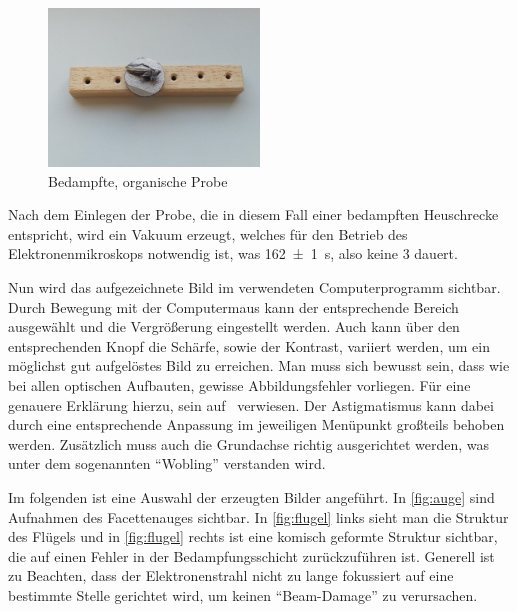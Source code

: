 \documentclass[12pt,english,ngerman]{scrartcl}
\begin{document}
\begin{figure}[H]
	\begin{center}
		\includegraphics[width =0.5\textwidth]{./figures/probe.png}
	\end{center}
	\caption[Bedampfte, organische Probe] {Bedampfte, organische
		Probe~\cite{zankel_bedampfte_nodate}
	}\label{fig:probe}
\end{figure}

Nach dem Einlegen der Probe, die in diesem Fall einer bedampften Heuschrecke entspricht,
wird ein Vakuum erzeugt, welches für den Betrieb
des Elektronenmikroskops notwendig ist, was \SI{162(1)}{\s}, also keine
\SI{3}{\min} dauert.

Nun wird das aufgezeichnete Bild im verwendeten Computerprogramm sichtbar.
Durch Bewegung mit der Computermaus kann der entsprechende Bereich ausgewählt
und die Vergrößerung eingestellt werden. Auch kann über den entsprechenden
Knopf die Schärfe, sowie der Kontrast, variiert werden, um ein möglichst gut
aufgelöstes Bild zu erreichen. Man muss sich bewusst sein, dass wie bei allen
optischen Aufbauten, gewisse Abbildungsfehler vorliegen. Für eine genauere
Erklärung hierzu, sein auf~\cite{zankel_vorbereitungsunterlagen_2013}
verwiesen. Der Astigmatismus kann dabei durch eine entsprechende Anpassung im jeweiligen
Menüpunkt großteils behoben werden. Zusätzlich muss auch die Grundachse richtig
ausgerichtet werden, was unter dem sogenannten ``Wobling'' verstanden wird.

Im folgenden ist eine Auswahl der erzeugten Bilder angeführt. In
\autoref{fig:auge} sind Aufnahmen des Facettenauges sichtbar. In
\autoref{fig:flugel} links sieht man die Struktur des Flügels und in
\autoref{fig:flugel} rechts ist eine komisch geformte Struktur sichtbar, die
auf einen Fehler in der Bedampfungsschicht zurückzuführen ist. Generell ist zu
Beachten, dass der Elektronenstrahl nicht zu lange fokussiert auf eine
bestimmte Stelle gerichtet wird, um keinen ``Beam-Damage'' zu verursachen.
\end{document}
